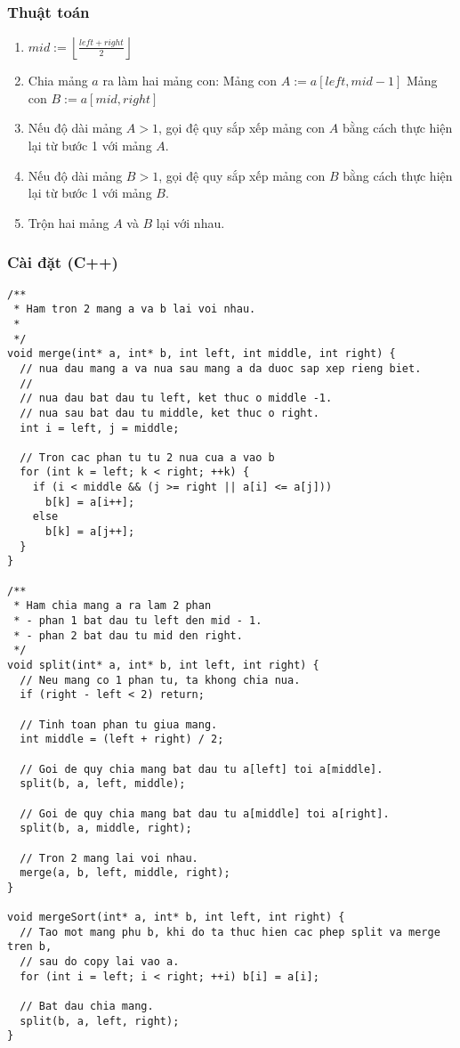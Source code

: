 \documentclass[]{article}
\begin{document}
\subsubsection{Thuật toán}
\begin{enumerate}
\item $\displaystyle mid := \left\lfloor\frac{left + right}{2}\right\rfloor$
\item Chia mảng $a$ ra làm hai mảng con:
\subitem Mảng con $A := a[left, mid - 1]$
\subitem Mảng con $B := a[mid, right]$
\item Nếu độ dài mảng $A > 1$, gọi đệ quy sắp xếp mảng con $A$ bằng cách thực hiện lại từ bước 1 với mảng $A$.
\item Nếu độ dài mảng $B > 1$, gọi đệ quy sắp xếp mảng con $B$ bằng cách thực hiện lại từ bước 1 với mảng $B$.
\item Trộn hai mảng $A$ và $B$ lại với nhau.
\end{enumerate}

\subsubsection{Cài đặt (C++)}
\begin{lstlisting}
/**
 * Ham tron 2 mang a va b lai voi nhau.
 *
 */
void merge(int* a, int* b, int left, int middle, int right) {
  // nua dau mang a va nua sau mang a da duoc sap xep rieng biet.
  //
  // nua dau bat dau tu left, ket thuc o middle -1.
  // nua sau bat dau tu middle, ket thuc o right.
  int i = left, j = middle;

  // Tron cac phan tu tu 2 nua cua a vao b
  for (int k = left; k < right; ++k) {
    if (i < middle && (j >= right || a[i] <= a[j]))
      b[k] = a[i++];
    else
      b[k] = a[j++];
  }
}

/**
 * Ham chia mang a ra lam 2 phan
 * - phan 1 bat dau tu left den mid - 1.
 * - phan 2 bat dau tu mid den right.
 */
void split(int* a, int* b, int left, int right) {
  // Neu mang co 1 phan tu, ta khong chia nua.
  if (right - left < 2) return;

  // Tinh toan phan tu giua mang.
  int middle = (left + right) / 2;

  // Goi de quy chia mang bat dau tu a[left] toi a[middle].
  split(b, a, left, middle);

  // Goi de quy chia mang bat dau tu a[middle] toi a[right].
  split(b, a, middle, right);

  // Tron 2 mang lai voi nhau.
  merge(a, b, left, middle, right);
}

void mergeSort(int* a, int* b, int left, int right) {
  // Tao mot mang phu b, khi do ta thuc hien cac phep split va merge tren b,
  // sau do copy lai vao a.
  for (int i = left; i < right; ++i) b[i] = a[i];

  // Bat dau chia mang.
  split(b, a, left, right);
}
\end{lstlisting}
\end{document}
